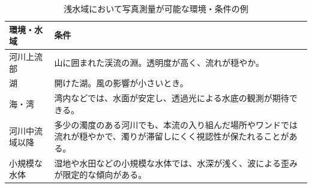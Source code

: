 \begin{table}[htbp]
  \centering
  \small
  \renewcommand{\arraystretch}{1.35}
  \setlength{\tabcolsep}{0.6em}
  \caption{浅水域において写真測量が可能な環境・条件の例}
  \label{tab:shallow-water-photogrammetry-sites}
  \begin{tabularx}{\textwidth}{@{} >{\RaggedRight\arraybackslash}p{8.0em} >{\RaggedRight\arraybackslash}X @{}}
    \toprule
    \textbf{環境・水域} & \textbf{条件} \\
    \midrule
    河川上流部 &
      山に囲まれた渓流の淵。透明度が高く、流れが穏やか。 \\
    \addlinespace[0.15em]
    湖 &
      開けた湖。風の影響が小さいとき。 \\
    \addlinespace[0.15em]
    海・湾 &
      湾内などでは、水面が安定し、透過光による水底の観測が期待できる。 \\
    \addlinespace[0.15em]
    河川中流域以降 &
      多少の濁度のある河川でも、本流の入り組んだ場所やワンドでは流れが穏やかで、濁りが滞留しにくく視認性が保たれることがある。 \\
    \addlinespace[0.15em]
    小規模な水体 &
      湿地や水田などの小規模な水体では、水深が浅く、波による歪みが限定的な傾向がある。 \\
    \bottomrule
  \end{tabularx}
\end{table}